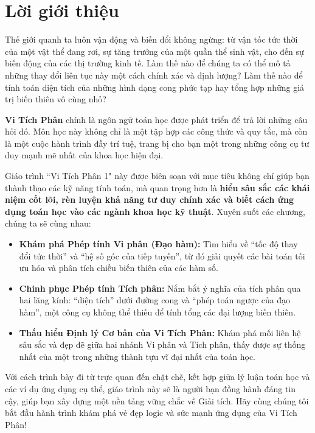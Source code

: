 \chapter*{Lời giới thiệu}

Thế giới quanh ta luôn vận động và biến đổi không ngừng: từ vận tốc tức thời của một vật thể đang rơi, sự tăng trưởng của một quần thể sinh vật, cho đến sự biến động của các thị trường kinh tế. Làm thế nào để chúng ta có thể mô tả những thay đổi liên tục này một cách chính xác và định lượng? Làm thế nào để tính toán diện tích của những hình dạng cong phức tạp hay tổng hợp những giá trị biến thiên vô cùng nhỏ?

\textbf{Vi Tích Phân} chính là ngôn ngữ toán học được phát triển để trả lời những câu hỏi đó. Môn học này không chỉ là một tập hợp các công thức và quy tắc, mà còn là một cuộc hành trình đầy trí tuệ, trang bị cho bạn một trong những công cụ tư duy mạnh mẽ nhất của khoa học hiện đại.

Giáo trình ``Vi Tích Phân 1" này được biên soạn với mục tiêu không chỉ giúp bạn thành thạo các kỹ năng tính toán, mà quan trọng hơn là \textbf{hiểu sâu sắc các khái niệm cốt lõi, rèn luyện khả năng tư duy chính xác và biết cách ứng dụng toán học vào các ngành khoa học kỹ thuật}. Xuyên suốt các chương, chúng ta sẽ cùng nhau:
\begin{itemize}
    \item \textbf{Khám phá Phép tính Vi phân (Đạo hàm):} Tìm hiểu về ``tốc độ thay đổi tức thời'' và ``hệ số góc của tiếp tuyến'', từ đó giải quyết các bài toán tối ưu hóa và phân tích chiều biến thiên của các hàm số.
    \item \textbf{Chinh phục Phép tính Tích phân:} Nắm bắt ý nghĩa của tích phân qua hai lăng kính: ``diện tích'' dưới đường cong và ``phép toán ngược của đạo hàm'', một công cụ không thể thiếu để tính tổng các đại lượng biến thiên.
    \item \textbf{Thấu hiểu Định lý Cơ bản của Vi Tích Phân:} Khám phá mối liên hệ sâu sắc và đẹp đẽ giữa hai nhánh Vi phân và Tích phân, thấy được sự thống nhất của một trong những thành tựu vĩ đại nhất của toán học.
\end{itemize}

Với cách trình bày đi từ trực quan đến chặt chẽ, kết hợp giữa lý luận toán học và các ví dụ ứng dụng cụ thể, giáo trình này sẽ là người bạn đồng hành đáng tin cậy, giúp bạn xây dựng một nền tảng vững chắc về Giải tích. Hãy cùng chúng tôi bắt đầu hành trình khám phá vẻ đẹp logic và sức mạnh ứng dụng của Vi Tích Phân!


